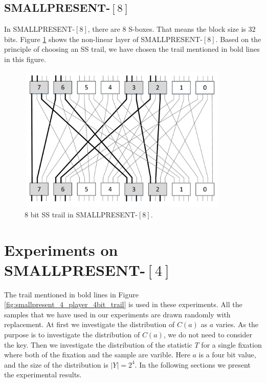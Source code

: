 \subsection{SMALLPRESENT-$[8]$}
In SMALLPRESENT-$[8]$, there are $8$ S-boxes. That means the block size is $32$ bits.   Figure \ref{fig:smallpresent_8_player} shows the non-linear layer of SMALLPRESENT-$[8]$. Based on the principle of choosing an SS trail, we have chosen the trail mentioned in bold lines in this figure. 
\begin{figure}[h!]
    \centering
    \includegraphics[width=0.9\textwidth,height = 7cm]{images/SMALLPRESENT-8_8bit_trail}
    \caption{8 bit SS trail in SMALLPRESENT-$[8]$.}
    \label{fig:smallpresent_8_player}
\end{figure}
\section{Experiments on SMALLPRESENT-$[4]$}
The trail mentioned in bold lines in Figure \ref{fig:smallpresent_4_player_4bit_trail} is used in these experiments. All the samples that we have used in our experiments are drawn randomly with replacement. At first we investigate the distribution of $C\left(a\right)$ as $a$ varies. As the purpose is to investigate the distribution of $C(a)$, we do not need to consider the key. Then we investigate the distribution of the statistic $T$ for a single fixation where both of the fixation and the sample are varible. Here $a$ is a four bit value, and the size of the distribution is $|Y| = 2^4$.  In the following sections we present the experimental results.
